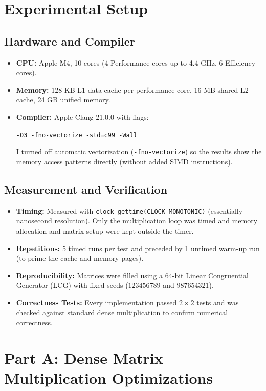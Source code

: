 \documentclass[10pt,conference,a4paper]{IEEEtran}
\begin{document}
\section{Experimental Setup}

\subsection{Hardware and Compiler}
\begin{itemize}
    \item \textbf{CPU:} Apple M4, 10 cores (4 Performance cores up to 4.4 GHz, 6 Efficiency cores).
    \item \textbf{Memory:} 128 KB L1 data cache per performance core, 16 MB shared L2 cache, 24 GB unified memory.
    \item \textbf{Compiler:} Apple Clang 21.0.0 with flags:
    \begin{center}
    \texttt{-O3 -fno-vectorize -std=c99 -Wall}
    \end{center}
    I turned off automatic vectorization (\texttt{-fno-vectorize}) so the results show the memory access patterns directly (without added SIMD instructions).
\end{itemize}

\subsection{Measurement and Verification}
\begin{itemize}
    \item \textbf{Timing:} Measured with \texttt{clock\_gettime(CLOCK\_MONOTONIC)} (essentially nanosecond resolution). Only the multiplication loop was timed and memory allocation and matrix setup were kept outside the timer.
    \item \textbf{Repetitions:} 5 timed runs per test and preceded by 1 untimed warm-up run (to prime the cache and memory pages).
    \item \textbf{Reproducibility:} Matrices were filled using a 64-bit Linear Congruential Generator (LCG) with fixed seeds ($123456789$ and $987654321$).
    \item \textbf{Correctness Tests:} Every implementation passed $2\times 2$ tests and was checked against standard dense multiplication to confirm numerical correctness.
\end{itemize}

\section{Part A: Dense Matrix Multiplication Optimizations}
\end{document}
